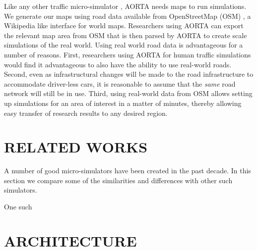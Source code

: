 \documentclass[letterpaper, 10 pt, conference]{ieeeconf}  %
\begin{document}
Like any other traffic micro-simulator , AORTA needs maps to run simulations. We generate our maps using road data available from OpenStreetMap (OSM) \cite{osm}, a Wikipedia like interface for world maps. Researchers using AORTA can export the relevant map area from OSM that is then parsed by AORTA to create scale simulations of the real world. Using real world road data is advantageous for a number of reasons. First, researchers using AORTA for human traffic simulations would find it advantageous to also have the ability to use real-world roads. Second, even as infrastructural changes will be made to the road infrastructure to accommodate driver-less cars, it is reasonable to assume that the \textit{same} road network will still be in use. Third, using real-world data from OSM allows setting up simulations for an area of interest in a matter of minutes, thereby allowing easy transfer of research results to any desired region.




\section{RELATED WORKS}


A number of good micro-simulators have been created in the past decade. In this section we compare some of the similarities and differences with other such simulators.

One such 


\section{ARCHITECTURE}
\end{document}
